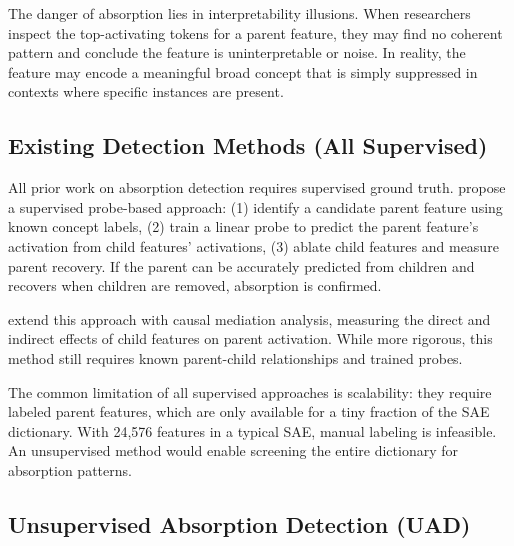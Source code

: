 \documentclass{article}
\begin{document}
The danger of absorption lies in interpretability illusions. When researchers inspect the top-activating tokens for a parent feature, they may find no coherent pattern and conclude the feature is uninterpretable or noise. In reality, the feature may encode a meaningful broad concept that is simply suppressed in contexts where specific instances are present.

\subsection{Existing Detection Methods (All Supervised)}

All prior work on absorption detection requires supervised ground truth. \citet{chanin2024absorption} propose a supervised probe-based approach: (1) identify a candidate parent feature using known concept labels, (2) train a linear probe to predict the parent feature's activation from child features' activations, (3) ablate child features and measure parent recovery. If the parent can be accurately predicted from children and recovers when children are removed, absorption is confirmed.

\citet{karvonen2025causal} extend this approach with causal mediation analysis, measuring the direct and indirect effects of child features on parent activation. While more rigorous, this method still requires known parent-child relationships and trained probes.

The common limitation of all supervised approaches is scalability: they require labeled parent features, which are only available for a tiny fraction of the SAE dictionary. With 24,576 features in a typical SAE, manual labeling is infeasible. An unsupervised method would enable screening the entire dictionary for absorption patterns.

\subsection{Unsupervised Absorption Detection (UAD)}
\end{document}
